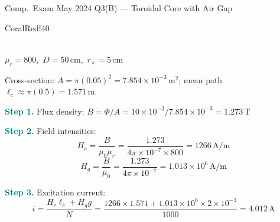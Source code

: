 \documentclass[a4paper, 11pt]{article}
\newcommand{\ans}[1]{\boxed{#1}}
\newcommand{\step}[1]{\par\smallskip\textcolor{Teal}{\textbf{Step #1.}}\enspace}
\begin{document}
\begin{solvedbox}{Comp.\ Exam May 2024 Q3(B) --- Toroidal Core with Air Gap}
\noindent\begin{minipage}[t]{0.40\linewidth}
\vspace{0pt}
\begin{circbox}[CoralBG]{CoralRed!40}
\centering
{}\\[3pt]
{\footnotesize $\mu_r{=}800$,\ $D{=}50\,\mathrm{cm}$,\ $r_{\times}{=}5\,\mathrm{cm}$}
\end{circbox}
\end{minipage}%
\hfill%
\begin{minipage}[t]{0.56\linewidth}
\vspace{0pt}
Cross-section: $A=\pi(0.05)^2=7.854{\times}10^{-3}\,\mathrm{m}^2$; mean path $\ell_c\approx\pi(0.5)=1.571\,\mathrm{m}$.

\step{1} Flux density: $B=\Phi/A=10{\times}10^{-3}/7.854{\times}10^{-3}=\ans{1.273\,\mathrm{T}}$

\step{2} Field intensities:
\[H_c=\frac{B}{\mu_0\mu_r}=\frac{1.273}{4\pi{\times}10^{-7}{\times}800}=\ans{1266\,\mathrm{A/m}}\]
\[H_g=\frac{B}{\mu_0}=\frac{1.273}{4\pi{\times}10^{-7}}=\ans{1.013{\times}10^6\,\mathrm{A/m}}\]
\step{3} Excitation current:
\[i=\frac{H_c\ell_c+H_g g}{N}=\frac{1266{\times}1.571+1.013{\times}10^6{\times}2{\times}10^{-3}}{1000}=\ans{4.012\,\mathrm{A}}\]
\end{minipage}
\end{solvedbox}
\end{document}
